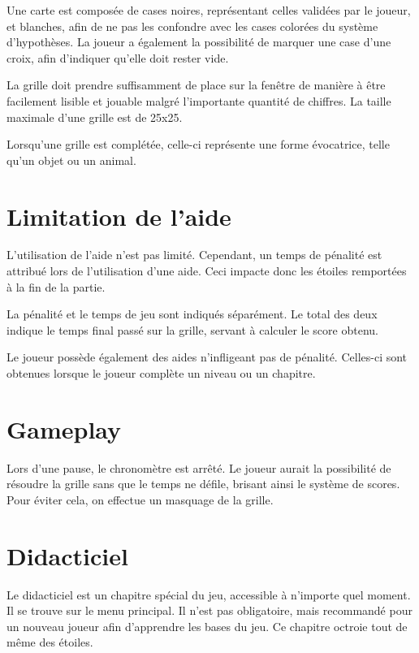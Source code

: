 \documentclass[a4paper, 12pt]{report}
\begin{document}
		Une carte est composée de cases noires, représentant celles validées par le joueur, et blanches, afin de ne pas les confondre avec les cases colorées du système d'hypothèses.
		La joueur a également la possibilité de marquer une case d'une croix, afin d'indiquer qu'elle doit rester vide.
		
		La grille doit prendre suffisamment de place sur la fenêtre de manière à être facilement lisible et jouable malgré l'importante quantité de chiffres. La taille maximale d'une grille est de 25x25.
		
		Lorsqu'une grille est complétée, celle-ci représente une forme évocatrice, telle qu'un objet ou un animal.
	
	\section{Limitation de l'aide}
	
		L'utilisation de l'aide n'est pas limité. Cependant, un temps de pénalité est attribué lors de l'utilisation d'une aide. Ceci impacte donc les étoiles remportées à la fin de la partie. 
		
		La pénalité et le temps de jeu sont indiqués séparément. Le total des deux indique le temps final passé sur la grille, servant à calculer le score obtenu. 
		
		Le joueur possède également des aides n'infligeant pas de pénalité. Celles-ci sont obtenues lorsque le joueur complète un niveau ou un chapitre. 
	
	\section{Gameplay}
	
		Lors d'une pause, le chronomètre est arrêté. Le joueur aurait la possibilité de résoudre la grille sans que le temps ne défile, brisant ainsi le système de scores. 
		Pour éviter cela, on effectue un masquage de la grille.
		
	\section{Didacticiel}
	
		Le didacticiel est un chapitre spécial du jeu, accessible à n'importe quel moment. Il se trouve sur le menu principal. 
		Il n'est pas obligatoire, mais recommandé pour un nouveau joueur afin d'apprendre les bases du jeu. Ce chapitre octroie tout de même des étoiles.
		
\end{document}
